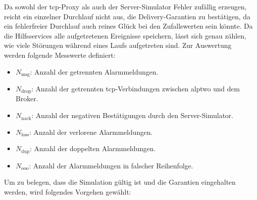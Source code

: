 Da sowohl der \gls{tcp}-Proxy als auch der Server-Simulator Fehler zufällig erzeugen, reicht ein einzelner Durchlauf nicht aus, die Delivery-Garantien zu bestätigen, da ein fehlerfreier Durchlauf auch reines Glück bei den Zufallswerten sein könnte. Da die Hilfsservices alle aufgetretenen Ereignisse speichern, lässt sich genau zählen, wie viele Störungen während eines Laufs aufgetreten sind. Zur Auswertung werden folgende Messwerte definiert:

\begin{itemize}
    \item $N_{\text{msg}}$: Anzahl der getrennten Alarmmeldungen.
    \item $N_{\text{drop}}$: Anzahl der getrennten \gls{tcp}-Verbindungen zwischen \gls{alptwo} und dem Broker.
    \item $N_{\text{nack}}$: Anzahl der negativen Bestätigungen durch den Server-Simulator.
    \item $N_{\text{loss}}$: Anzahl der verlorene Alarmmeldungen.
    \item $N_{\text{dup}}$: Anzahl der doppelten Alarmmeldungen.
    \item $N_{\text{ooo}}$: Anzahl der Alarmmeldungen in falscher Reihenfolge.
\end{itemize}

Um zu belegen, dass die Simulation gültig ist und die Garantien eingehalten werden, wird folgendes Vorgehen gewählt:

